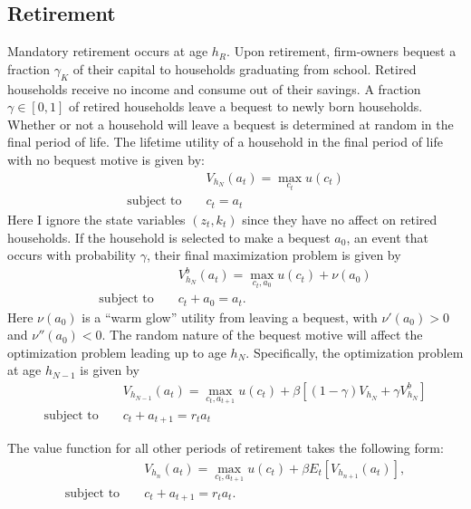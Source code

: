\documentclass[11pt]{article}
\theoremstyle{definition}
\numberwithin{equation}{section}
\begin{document}
\subsection{Retirement}
Mandatory retirement occurs at age $h_R$. Upon retirement, firm-owners bequest a fraction $\gamma_K$ of their capital to households graduating from school. Retired households receive no income and consume out of their savings. A fraction $\gamma\in[0,1]$ of retired households leave a bequest to newly born households. Whether or not a household will leave a bequest is determined at random in the final period of life. The lifetime utility of a household in the final period of life with no bequest motive is given by:
%
\begin{eqnarray}
&& V_{h_N}(a_t) = \max_{c_t} u(c_t)\\
\text{subject to } && c_t = a_t
\end{eqnarray}
Here I ignore the state variables $(z_t,k_t)$ since they have no affect on retired households. If the household is selected to make a bequest $a_0$, an event that occurs with probability $\gamma$, their final maximization problem is given by 
\begin{eqnarray}
&& V^b_{h_N}(a_t) = \max_{c_t,a_0} u(c_t) + \nu(a_0)\\
\text{subject to } && c_t + a_0 = a_t.
\end{eqnarray}
%
Here $\nu(a_0)$ is a ``warm glow'' utility from leaving a bequest, with $\nu'(a_0)>0$ and $\nu''(a_0)<0$. The random nature of the bequest motive will affect the optimization problem leading up to age $h_N$. Specifically, the optimization problem at age $h_{N-1}$ is given by
\begin{eqnarray}
&& V_{h_{N-1}}(a_t) = \max_{c_t, a_{t+1}} u(c_t) + \beta \left[ (1-\gamma)V_{h_N} + \gamma V^b_{h_N} \right]\\
\text{subject to } &&  c_t +a_{t+1} = r_ta_t
\end{eqnarray}

The value function for all other periods of retirement takes the following form:
\begin{eqnarray}
&& V_{h_{n}}(a_t) = \max_{c_t, a_{t+1}} u(c_t) + \beta E_t\left[ V_{h_{n+1}}(a_t)\right], \\
\text{subject to } && c_t +a_{t+1} = r_ta_t.
\end{eqnarray}






\newpage
{}

\end{document}
